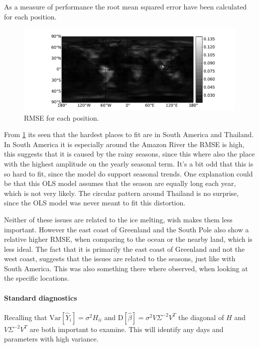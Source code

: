 As a measure of performance the root mean squared error have been calculated for each position.
\begin{figure}[H]
	\centering
	\includegraphics[width=\textwidth]{figures/ols-world-performance-rmse}
	\caption{RMSE for each position.}
	\label{fig:ols-world-performance-rmse}
\end{figure}

From \ref{fig:ols-world-performance-rmse} its seen that the hardest places to fit are in South America and Thailand. In South America it is especially around the Amazon River the RMSE is high, this suggests that it is caused by the rainy seasons, since this where also the place with the highest amplitude on the yearly seasonal term. It's a bit odd that this is so hard to fit, since the model do support seasonal trends. One explanation could be that this OLS model assumes that the season are equally long each year, which is not very likely. The circular pattern around Thailand is no surprise, since the OLS model was never meant to fit this distortion.

Neither of these issues are related to the ice melting, wish makes them less important. However the east coast of Greenland and the South Pole also show a relative higher RMSE, when comparing to the ocean or the nearby land, which is less ideal. The fact that it is primarily the east coast of Greenland and not the west coast, suggests that the issues are related to the seasons, just like with South America. This was also something there where observed, when looking at the specific locations.

\paragraph{Standard diagnostics} Recalling that $\mathrm{Var}[\hat{Y}_i] = \sigma^{2} H_{ii}$ and $\mathrm{D}[\hat{\beta}] = \sigma^{2} V \Sigma^{-2} V^T$ the diagonal of $H$ and $V \Sigma^{-2} V^T$ are both important to examine. This will identify any days and parameters with high variance.

